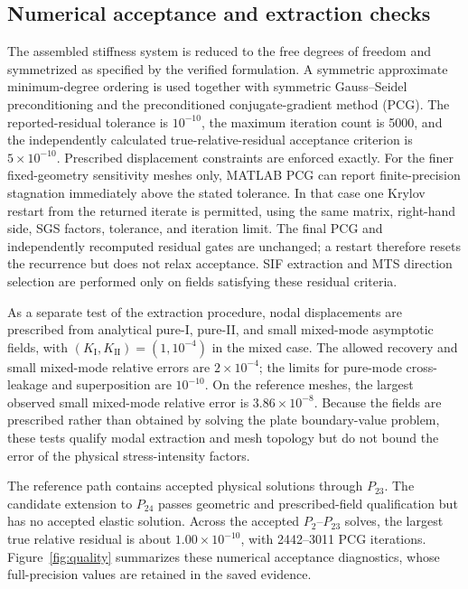 \documentclass[11pt]{article}
\newcommand{\SyntheticRelativeError}{3.86\times10^{-8}}
\newcommand{\MaxTrueResidual}{1.00\times10^{-10}}
\begin{document}
\subsection{Numerical acceptance and extraction checks}
The assembled stiffness system is reduced to the free degrees of
freedom and symmetrized as specified by the verified formulation.
A symmetric approximate minimum-degree ordering is used together
with symmetric Gauss--Seidel preconditioning and the
preconditioned conjugate-gradient method (PCG). The reported-residual
tolerance is $10^{-10}$, the maximum iteration count is 5000, and
the independently calculated true-relative-residual acceptance
criterion is $5\times10^{-10}$. Prescribed displacement
constraints are enforced exactly.
For the finer fixed-geometry sensitivity meshes only, MATLAB PCG can report
finite-precision stagnation immediately above the stated tolerance. In that
case one Krylov restart from the returned iterate is permitted, using the
same matrix, right-hand side, SGS factors, tolerance, and iteration limit.
The final PCG and independently recomputed residual gates are unchanged;
a restart therefore resets the recurrence but does not relax acceptance.
SIF extraction and MTS direction selection are performed
only on fields satisfying these residual criteria.

As a separate test of the extraction procedure, nodal
displacements are prescribed from analytical pure-I, pure-II, and
small mixed-mode asymptotic fields, with
$(K_{\mathrm{I}},K_{\mathrm{II}})=(1,10^{-4})$ in the mixed case.
The allowed recovery and small mixed-mode relative errors are
$2\times10^{-4}$; the limits for pure-mode cross-leakage and
superposition are $10^{-10}$. On the reference meshes, the largest
observed small mixed-mode relative error is
$\SyntheticRelativeError$. Because the fields are prescribed rather
than obtained by solving the plate boundary-value problem, these
tests qualify modal extraction and mesh topology but do not bound
the error of the physical stress-intensity factors.

The reference path contains accepted physical solutions through
$P_{23}$. The candidate extension to $P_{24}$ passes geometric
and prescribed-field qualification but has no accepted elastic
solution. Across the accepted $P_2$--$P_{23}$ solves, the
largest true relative residual is about $\MaxTrueResidual$,
with 2442--3011 PCG iterations. Figure~\ref{fig:quality}
summarizes these numerical acceptance diagnostics, whose
full-precision values are retained in the saved evidence.
\end{document}

